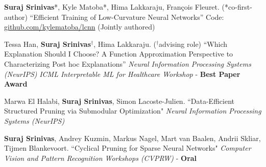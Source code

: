 \documentclass[11pt,a4paper,sans,english]{moderncv}        %
\begin{document}
 {\textbf{Suraj Srinivas}*, Kyle Matoba*, Hima Lakkaraju, Fran\c{c}ois Fleuret. (*co-first-author) \newline ``Efficient Training of Low-Curvature Neural Networks'' 
\newline Code: \href{https://github.com/kylematoba/lcnn}{github.com/kylematoba/lcnn} (Jointly authored)
}
\vspace*{0.25em}

 {Tessa Han, \textbf{Suraj Srinivas$^\dagger$}, Hima Lakkaraju. ($^\dagger$advising role)
\newline ``Which Explanation Should I Choose? A Function Approximation Perspective to Characterizing Post hoc Explanations''
\newline \textit{Neural Information Processing Systems (NeurIPS)} \newline \textit{ICML Interpretable ML for Healthcare Workshop} - \textbf{Best Paper Award}}
\vspace*{0.25em}

 {Marwa El Halabi, \textbf{Suraj Srinivas}, Simon Lacoste-Julien.
\newline ``Data-Efficient Structured Pruning via Submodular Optimization" \newline \textit{Neural Information Processing Systems (NeurIPS)}}

\vspace*{0.25em}
 {\textbf{Suraj Srinivas}, Andrey Kuzmin, Markus Nagel, Mart van Baalen, \newline Andrii Skliar, Tijmen Blankevoort. \newline ``Cyclical Pruning for Sparse Neural Networks" 
\newline \textit{Computer Vision and Pattern Recognition Workshops (CVPRW)} - \textbf{Oral}}

\vspace*{0.25em}
\vspace*{0.25em}
\end{document}
